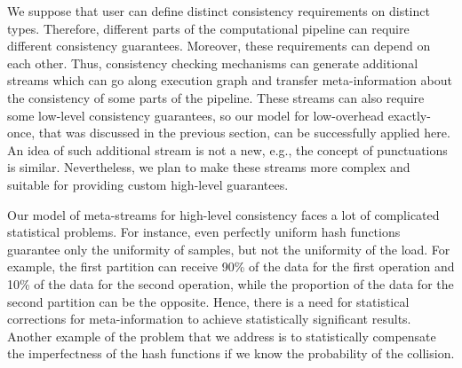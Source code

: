 We suppose that user can define distinct consistency requirements on distinct types. Therefore, different parts of the computational pipeline can require different consistency guarantees. Moreover, these requirements can depend on each other. Thus, consistency checking mechanisms can generate additional streams which can go along execution graph and transfer meta-information about the consistency of some parts of the pipeline. These streams can also require some low-level consistency guarantees, so our model for low-overhead exactly-once, that was discussed in the previous section, can be successfully applied here. An idea of such additional stream is not a new, e.g., the concept of punctuations~\cite{Tucker:2003:EPS:776752.776780} is similar. Nevertheless, we plan to make these streams more complex and suitable for providing custom high-level guarantees.

Our model of meta-streams for high-level consistency faces a lot of complicated statistical problems. For instance, even perfectly uniform hash functions guarantee only the uniformity of samples, but not the uniformity of the load. For example, the first partition can receive 90\% of the data for the first operation and 10\% of the data for the second operation, while the proportion of the data for the second partition can be the opposite. Hence, there is a need for statistical corrections for meta-information to achieve statistically significant results. Another example of the problem that we address is to statistically compensate the imperfectness of the hash functions if we know the probability of the collision.  